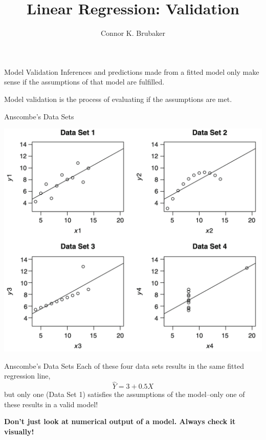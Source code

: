 \documentclass{beamer}
\title{Linear Regression: Validation}
\author{Connor K. Brubaker}
\institute{
Department of Statistics \\
Texas A\&M University
}
\date{}
\begin{document}
\maketitle

\begin{frame}{Model Validation}
    Inferences and predictions made from a fitted model only make sense if the assumptions of that model are fulfilled.

    \vspace{1em}
    Model validation is the process of evaluating if the assumptions are met.
\end{frame}

\begin{frame}{Anscombe’s Data Sets}
    \begin{center}
        \includegraphics[width=.75\linewidth]{figures/Anscombe.png}
    \end{center}
\end{frame}

\begin{frame}{Anscombe’s Data Sets}
    Each of these four data sets results in the same fitted regression line,
    \begin{equation*}
        \hat{Y} = 3 + 0.5 X
    \end{equation*}
    but only one (Data Set 1) satisfies the assumptions of the model--only one of these results in a valid model! 

    \vspace*{1em}

    \textbf{Don't just look at numerical output of a model. Always check it visually!}
\end{frame}
\end{document}
